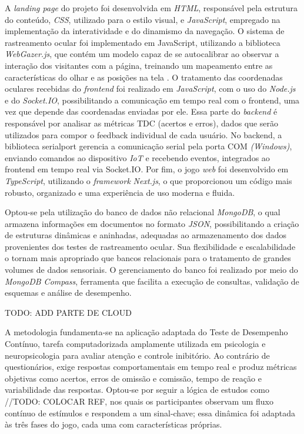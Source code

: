 A \textit{landing page} do projeto foi desenvolvida em \textit{HTML}, responsável pela estrutura do conteúdo, \textit{CSS}, utilizado para o estilo visual, e \textit{JavaScript}, empregado na implementação da interatividade e do dinamismo da navegação. O sistema de rastreamento ocular foi implementado em JavaScript, utilizando a biblioteca \textit{WebGazer.js}, que contém um modelo capaz de se autocalibrar ao observar a interação dos visitantes com a página, treinando um mapeamento entre as características do olhar e as posições na tela \cite{papoutsaki2016webgazer}. O tratamento das coordenadas oculares recebidas do \textit{frontend} foi realizado em \textit{JavaScript}, com o uso do \textit{Node.js} e do \textit{Socket.IO}, possibilitando a comunicação em tempo real com o frontend, uma vez que depende das coordenadas enviadas por ele. Essa parte do \textit{backend} é responsável por analisar as métricas TDC (acertos e erros), dados que serão utilizados para compor o feedback individual de cada usuário. No backend, a biblioteca serialport gerencia a comunicação serial pela porta COM \textit{(Windows)}, enviando comandos ao dispositivo \textit{IoT} e recebendo eventos, integrados ao frontend em tempo real via Socket.IO. Por fim, o jogo \textit{web} foi desenvolvido em \textit{TypeScript}, utilizando o \textit{framework} \textit{Next.js}, o que proporcionou um código mais robusto, organizado e uma experiência de uso moderna e fluida.

Optou-se pela utilização do banco de dados não relacional \textit{MongoDB}, o qual armazena informações em documentos no formato \textit{JSON}, possibilitando a criação de estruturas dinâmicas e aninhadas, adequadas ao armazenamento dos dados provenientes dos testes de rastreamento ocular. Sua flexibilidade e escalabilidade o tornam mais apropriado que bancos relacionais para o tratamento de grandes volumes de dados sensoriais. O gerenciamento do banco foi realizado por meio do \textit{MongoDB Compass}, ferramenta que facilita a execução de consultas, validação de esquemas e análise de desempenho.

TODO: ADD PARTE DE CLOUD

A metodologia fundamenta-se na aplicação adaptada do Teste de Desempenho Contínuo, tarefa computadorizada amplamente utilizada em psicologia e neuropsicologia para avaliar atenção e controle inibitório. Ao contrário de questionários, exige respostas comportamentais em tempo real e produz métricas objetivas como acertos, erros de omissão e comissão, tempo de reação e variabilidade das respostas. Optou‑se por seguir a lógica de estudos como //TODO: COLOCAR REF, nos quais os participantes observam um fluxo contínuo de estímulos e respondem a um sinal‑chave; essa dinâmica foi adaptada às três fases do jogo, cada uma com características próprias.

